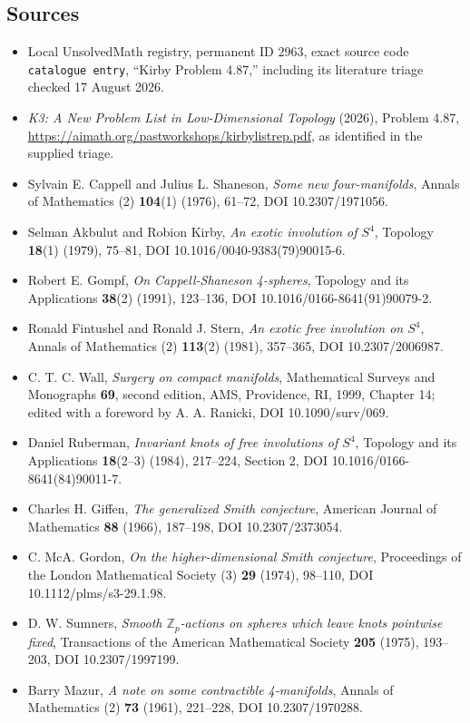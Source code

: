 \documentclass[11pt]{article}
\newcommand{\Z}{\mathbb{Z}}
\begin{document}
\subsection{Sources}
\begin{itemize}
\item Local UnsolvedMath registry, permanent ID $2963$, exact source code \texttt{catalogue entry}, ``Kirby Problem 4.87,'' including its literature triage checked 17 August 2026.
\item \emph{K3: A New Problem List in Low-Dimensional Topology} (2026), Problem 4.87, \url{https://aimath.org/pastworkshops/kirbylistrep.pdf}, as identified in the supplied triage.
\item [CS76] Sylvain E. Cappell and Julius L. Shaneson, \emph{Some new four-manifolds}, Annals of Mathematics (2) \textbf{104}(1) (1976), 61--72, DOI 10.2307/1971056.
\item [AK79a] Selman Akbulut and Robion Kirby, \emph{An exotic involution of $S^4$}, Topology \textbf{18}(1) (1979), 75--81, DOI 10.1016/0040-9383(79)90015-6.
\item [Gom91b] Robert E. Gompf, \emph{On Cappell-Shaneson 4-spheres}, Topology and its Applications \textbf{38}(2) (1991), 123--136, DOI 10.1016/0166-8641(91)90079-2.
\item [FS81] Ronald Fintushel and Ronald J. Stern, \emph{An exotic free involution on $S^4$}, Annals of Mathematics (2) \textbf{113}(2) (1981), 357--365, DOI 10.2307/2006987.
\item [Wal99] C. T. C. Wall, \emph{Surgery on compact manifolds}, Mathematical Surveys and Monographs \textbf{69}, second edition, AMS, Providence, RI, 1999, Chapter 14; edited with a foreword by A. A. Ranicki, DOI 10.1090/surv/069.
\item [Rub84] Daniel Ruberman, \emph{Invariant knots of free involutions of $S^4$}, Topology and its Applications \textbf{18}(2--3) (1984), 217--224, Section 2, DOI 10.1016/0166-8641(84)90011-7.
\item [Gif66] Charles H. Giffen, \emph{The generalized Smith conjecture}, American Journal of Mathematics \textbf{88} (1966), 187--198, DOI 10.2307/2373054.
\item [Gor74] C. McA. Gordon, \emph{On the higher-dimensional Smith conjecture}, Proceedings of the London Mathematical Society (3) \textbf{29} (1974), 98--110, DOI 10.1112/plms/s3-29.1.98.
\item [Sum75] D. W. Sumners, \emph{Smooth $\Z_p$-actions on spheres which leave knots pointwise fixed}, Transactions of the American Mathematical Society \textbf{205} (1975), 193--203, DOI 10.2307/1997199.
\item [Maz61] Barry Mazur, \emph{A note on some contractible 4-manifolds}, Annals of Mathematics (2) \textbf{73} (1961), 221--228, DOI 10.2307/1970288.
\end{itemize}
\end{document}
